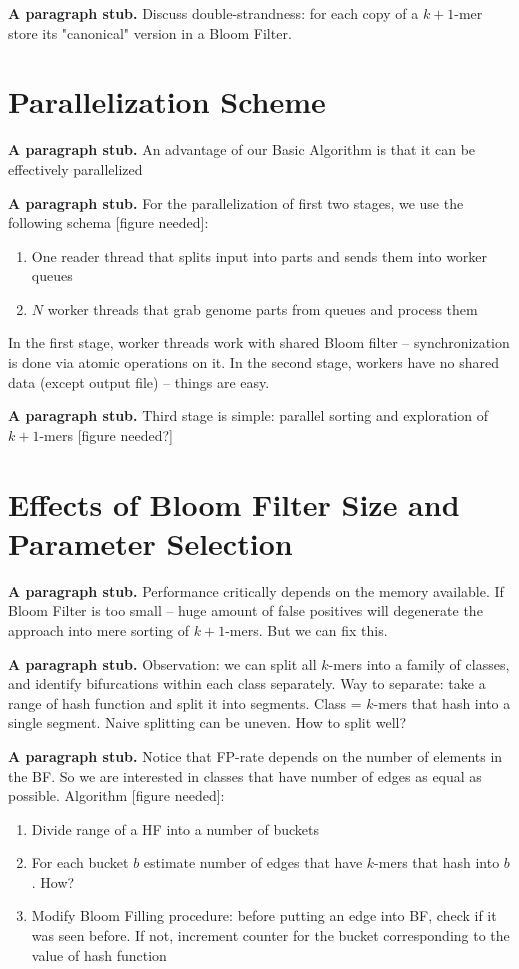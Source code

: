\documentclass{llncs}
\newcommand{\stub}{\textbf{A paragraph stub. }}
\begin{document}
\stub Discuss double-strandness: for each copy of a $k + 1$-mer store its "canonical" version in a Bloom Filter.


\section{Parallelization Scheme}
\stub An advantage of our Basic Algorithm is that it can be effectively parallelized

\stub For the parallelization of first two stages, we use the following schema [figure needed]:
\begin{enumerate}
	\item One reader thread that splits input into parts and sends them into worker queues
	\item $N$ worker threads that grab genome parts from queues and process them
\end{enumerate}
In the first stage, worker threads work with shared Bloom filter -- synchronization is done via atomic operations on it.
In the second stage, workers have no shared data (except output file) -- things are easy.

\stub Third stage is simple: parallel sorting and exploration of $k + 1$-mers [figure needed?]

\section{Effects of Bloom Filter Size  and Parameter Selection}
\stub Performance critically depends on the memory available.
If Bloom Filter is too small -- huge amount of false positives will degenerate the approach into mere sorting of $k + 1$-mers.
But we can fix this.

\stub Observation: we can split all $k$-mers into a family of classes, and identify bifurcations within each class separately.
Way to separate: take a range of hash function and split it into segments.
Class = $k$-mers that hash into a single segment.
Naive splitting can be uneven.
How to split well?

\stub Notice that FP-rate depends on the number of elements in the BF.
So we are interested in classes that have number of edges as equal as possible.
Algorithm [figure needed]:
\begin{enumerate}
\item Divide range of a HF into a number of buckets
\item For each bucket $b$ estimate number of edges that have $k$-mers that hash into $b$. How?
\item Modify Bloom Filling procedure: before putting an edge into BF, check if it was seen before. 
If not, increment counter for the bucket corresponding to the value of hash function
\end{enumerate}
\end{document}
